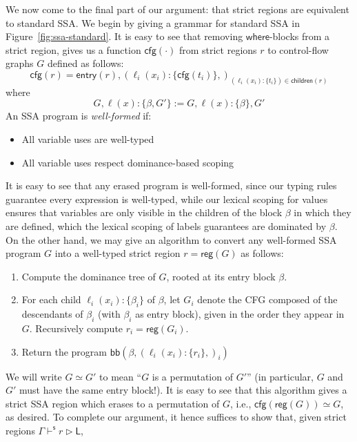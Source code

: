 \documentclass[acmsmall,screen,review]{acmart}
\newcommand{\ms}[1]{\ensuremath{\mathsf{#1}}}
\newcommand{\lto}{:}
\newcommand{\wbranch}[3]{#1(#2) \lto \{#3\}}
\newcommand{\shaslb}[3]{#1 \vdash^{\ms{s}} #2 \rhd #3}
\newcommand{\toentry}[1]{\ms{entry}(#1)}
\newcommand{\todom}[1]{\ms{children}(#1)}
\newcommand{\tocfg}[1]{\ms{cfg}(#1)}
\newcommand{\adddom}[2]{\ms{bb}(#1, #2)}
\newcommand{\toreg}[1]{\ms{reg}(#1)}
\begin{document}
We now come to the final part of our argument: that strict regions are equivalent to standard SSA.
We begin by giving a grammar for standard SSA in Figure~\ref{fig:ssa-standard}. It is easy to see
that removing \ms{where}-blocks from a strict region, gives us a function $\tocfg{\cdot}$ from
strict regions $r$ to control-flow graphs $G$ defined as follows:
\begin{equation}
    \tocfg{r} = \toentry{r}, (\wbranch{\ell_i}{x_i}{\tocfg{t_i}},)_{
      (\wbranch{\ell_i}{x_i}{t_i}) \in \todom{r}}
\end{equation}
where
\begin{equation}
  G, \wbranch{\ell}{x}{\beta, G'} := G, \wbranch{\ell}{x}{\beta}, G' 
\end{equation}
An SSA program is \emph{well-formed} if:
\begin{itemize}
  \item All variable uses are well-typed
  \item All variable uses respect dominance-based scoping
\end{itemize}
It is easy to see that any erased program is well-formed, since our typing rules guarantee every
expression is well-typed, while our lexical scoping for values ensures that variables are only
visible in the children of the block $\beta$ in which they are defined, which the lexical scoping of
labels guarantees are dominated by $\beta$. On the other hand, we may give an algorithm to convert
any well-formed SSA program $G$ into a well-typed strict region $r = \toreg{G}$ as follows:
\begin{enumerate}
  \item Compute the dominance tree of $G$, rooted at its entry block $\beta$.
  \item For each child $\wbranch{\ell_i}{x_i}{\beta_i}$ of $\beta$, let $G_i$ denote the CFG
  composed of the descendants of $\beta_i$ (with $\beta_i$ as entry block), given in the order they
  appear in $G$. Recursively compute $r_i = \toreg{G_i}$.
  \item Return the program $\adddom{\beta}{(\wbranch{\ell_i}{x_i}{r_i},)_i}$
\end{enumerate}
We will write $G \simeq G'$ to mean ``$G$ is a permutation of $G'$'' (in particular, $G$ and $G'$
must have the same entry block!). It is easy to see that this algorithm gives a strict SSA region
which erases to a permutation of $G$, i.e., $\tocfg{\toreg{G}} \simeq G$, as desired. To complete
our argument, it hence suffices to show that, given strict regions $\shaslb{\Gamma}{r}{\ms{L}}$,
\end{document}
